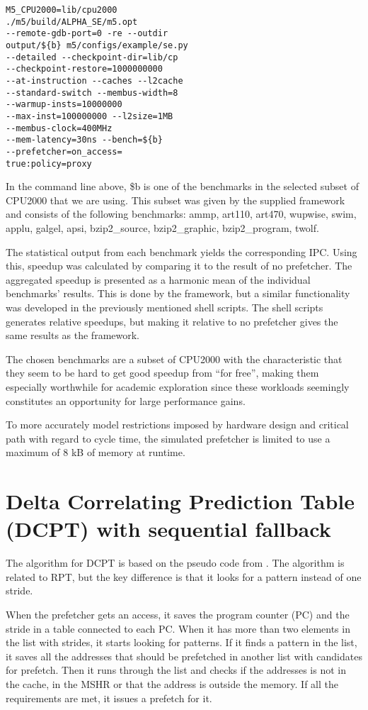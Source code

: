 \documentclass[12pt,journal,compsoc]{IEEEtran}
\begin{document}
\begin{verbatim}
M5_CPU2000=lib/cpu2000
./m5/build/ALPHA_SE/m5.opt
--remote-gdb-port=0 -re --outdir
output/${b} m5/configs/example/se.py
--detailed --checkpoint-dir=lib/cp
--checkpoint-restore=1000000000
--at-instruction --caches --l2cache
--standard-switch --membus-width=8
--warmup-insts=10000000
--max-inst=100000000 --l2size=1MB
--membus-clock=400MHz
--mem-latency=30ns --bench=${b}
--prefetcher=on_access=
true:policy=proxy
\end{verbatim}

In the command line above, \${b} is one of the benchmarks in the selected
subset of CPU2000 that we are using. This subset was given by the supplied
framework and consists of the following benchmarks: ammp, art110, art470,
wupwise, swim, applu, galgel, apsi, bzip2\_source, bzip2\_graphic,
bzip2\_program, twolf.

The statistical output from each benchmark yields the corresponding
IPC. Using this, speedup was calculated by comparing it to the result
of no prefetcher. The aggregated speedup is presented as a harmonic mean of
the individual benchmarks' results. This is done by the framework, but a
similar functionality was developed in the previously mentioned shell scripts.
The shell scripts generates relative speedups, but making it relative to no
prefetcher gives the same results as the framework.

The chosen benchmarks are a subset of CPU2000 with the characteristic that
they seem to be hard to get good speedup from ``for free'', making
them especially worthwhile for academic exploration since these workloads
seemingly constitutes an opportunity for large performance gains.

To more accurately model restrictions imposed by hardware design and
critical path with regard to cycle time, the simulated prefetcher is limited
to use a maximum of 8 kB of memory at runtime.

\section{Delta Correlating Prediction Table (DCPT) with sequential fallback}
The algorithm for DCPT is based on the pseudo code from \cite{dcptpaper}.
The algorithm is related to RPT, but the key difference is that it looks for a pattern instead of one stride.

When the prefetcher gets an access, it saves the program counter (PC) and the stride in a table connected to each PC. When it has more than two elements in the list with strides, it starts looking for patterns.
If it finds a pattern in the list, it saves all the addresses that should be prefetched in another list with candidates for prefetch.
Then it runs through the list and checks if the addresses is not in the cache, in the MSHR or that the address is outside the memory. If all the requirements are met, it issues a prefetch for it.
\end{document}
